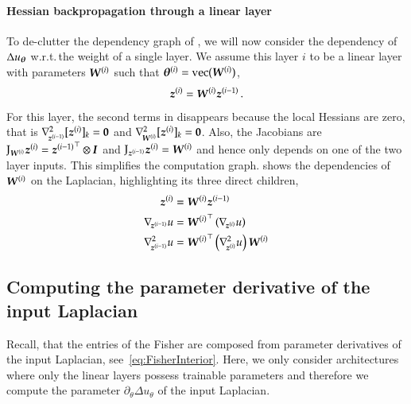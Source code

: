 \paragraph{Hessian backpropagation through a linear layer} To de-clutter the dependency graph of , we will now consider the dependency of $\Delta u_{{\boldsymbol{\theta}}}$ w.r.t.\,the weight of a single layer.
We assume this layer $i$ to be a linear layer with parameters ${\boldsymbol{W}}^{(i)}$ such that ${\boldsymbol{\theta}}^{(i)} = \operatorname{vec}({\boldsymbol{W}}^{(i)})$,
\begin{align}
  {\boldsymbol{z}}^{(i)} = {\boldsymbol{W}}^{(i)} {\boldsymbol{z}}^{(i-1)}\,.
\end{align}
For this layer, the second terms in  disappears because the local Hessians are zero, that is $\nabla_{\!{{\boldsymbol{z}}^{(i-1)}}}^{2}[{\boldsymbol{z}}^{(i)}]_k = {\boldsymbol{0}}$ and $\nabla_{\!{{\boldsymbol{W}}^{(i)}}}^{2}[{\boldsymbol{z}}^{(i)}]_k = {\boldsymbol{0}}$.
Also, the Jacobians are $\mathrm{J}_{{\boldsymbol{W}}^{(i)}}{\boldsymbol{z}}^{(i)} = {{\boldsymbol{z}}^{(i-1)}}^{\top} \otimes {\boldsymbol{I}}$ and $\mathrm{J}_{{\boldsymbol{z}}^{(i-1)}}{\boldsymbol{z}}^{(i)} = {\boldsymbol{W}}^{(i)}$ and hence only depends on one of the two layer inputs.
This simplifies the computation graph.
 shows the dependencies of ${\boldsymbol{W}}^{(i)}$ on the
Laplacian, highlighting its three direct children,
\begin{align}\label{eq:spatialDerivatives}
  \begin{split}
    {\boldsymbol{z}}^{(i)}
    &=
      {\boldsymbol{W}}^{(i)} {\boldsymbol{z}}^{(i-1)}
    \\
    \nabla_{\!{{\boldsymbol{z}}^{(i-1)}}}u
    &=
      {{\boldsymbol{W}}^{(i)}}^{\top}
      \left(
      \nabla_{\!{{\boldsymbol{z}}^{(i)}}}u
      \right)
    \\
    \nabla_{\!{{\boldsymbol{z}}^{(i-1)}}}^{2}u
    &=
      {{\boldsymbol{W}}^{(i)}}^{\top}
      \left(
      \nabla_{\!{{\boldsymbol{z}}^{(i)}}}^{2}u
      \right)
      {\boldsymbol{W}}^{(i)}
  \end{split}
\end{align}

\subsection{Computing the parameter derivative of the input Laplacian} 
Recall, that the entries of the Fisher are composed from parameter derivatives of the input Laplacian, see~\eqref{eq:FisherInterior}. 
Here, we only consider architectures where only the linear layers possess trainable parameters and therefore we compute the parameter $\partial_{\theta} \Delta u_\theta$ of the input Laplacian. 

